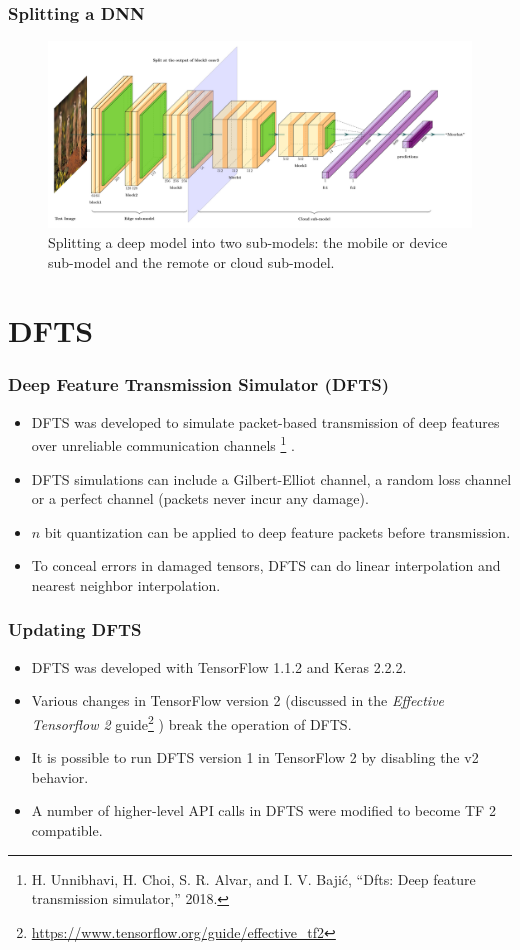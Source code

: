 \documentclass{beamer}
\begin{document}
\begin{frame}
	\frametitle{Splitting a DNN}
		\begin{figure}[H]
		\centering
		\includegraphics[scale = 0.27]{Figures/vgg16CI.pdf}
		\caption{Splitting a deep model into two sub-models: the mobile or device sub-model and the remote or cloud sub-model.}
		\label{fig:splitting}
	\end{figure}
\end{frame}

\section{DFTS}
\begin{frame}
	\frametitle{Deep Feature Transmission Simulator (DFTS)}
	\begin{itemize}
		\item DFTS was developed to simulate packet-based transmission of deep features over unreliable communication channels \footnote{\tiny{H. Unnibhavi, H. Choi, S. R. Alvar, and I. V. Bajić, “Dfts:
				Deep feature transmission simulator,” 2018.}} \cite{unnibhavi2018dfts}.
		\item DFTS simulations can include a Gilbert-Elliot channel, a random loss channel or a perfect channel (packets never incur any damage).
		\item $n$ bit quantization can be applied to deep feature packets before transmission.
		\item To conceal errors in damaged tensors, DFTS can do linear interpolation and nearest neighbor interpolation.
	\end{itemize}
\end{frame}

\begin{frame}
	\frametitle{Updating DFTS}
	\begin{itemize}
		\item DFTS was developed with TensorFlow 1.1.2 and Keras 2.2.2.
		\item Various changes in TensorFlow version 2 (discussed in the \textit{Effective Tensorflow 2} guide\footnote{\tiny{\url{https://www.tensorflow.org/guide/effective_tf2}}} \cite{tfv2}) break the operation of DFTS.
		\item It is possible to run DFTS version 1 in TensorFlow 2 by disabling the v2 behavior.
		\item A number of higher-level API calls in DFTS were modified to become TF 2 compatible. 
	\end{itemize}
\end{frame}
\end{document}
